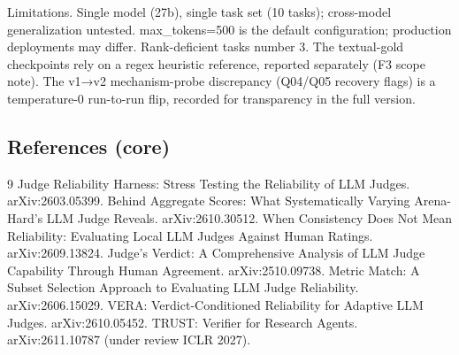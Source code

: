 \documentclass[10pt]{article}
\begin{document}
Limitations. Single model (27b), single task set (10 tasks); cross-model generalization untested. max\_tokens=500 is the default configuration; production deployments may differ. Rank-deficient tasks number 3. The textual-gold checkpoints rely on a regex heuristic reference, reported separately (F3 scope note). The v1→v2 mechanism-probe discrepancy (Q04/Q05 recovery flags) is a temperature-0 run-to-run flip, recorded for transparency in the full version.

\subsection*{References (core)}
\footnotesize\setlength{\itemsep}{1pt}
\begin{thebibliography}{9}
 Judge Reliability Harness: Stress Testing the Reliability of LLM Judges. arXiv:2603.05399.
 Behind Aggregate Scores: What Systematically Varying Arena-Hard's LLM Judge Reveals. arXiv:2610.30512.
 When Consistency Does Not Mean Reliability: Evaluating Local LLM Judges Against Human Ratings. arXiv:2609.13824.
 Judge's Verdict: A Comprehensive Analysis of LLM Judge Capability Through Human Agreement. arXiv:2510.09738.
 Metric Match: A Subset Selection Approach to Evaluating LLM Judge Reliability. arXiv:2606.15029.
 VERA: Verdict-Conditioned Reliability for Adaptive LLM Judges. arXiv:2610.05452.
 TRUST: Verifier for Research Agents. arXiv:2611.10787 (under review ICLR 2027).
\end{thebibliography}
\end{document}
